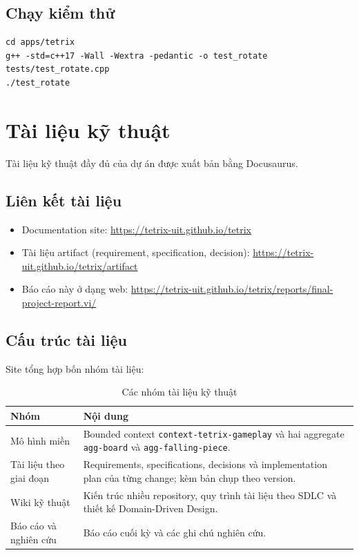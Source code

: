 \documentclass[12pt,a4paper]{article}
\begin{document}
\subsection{Chạy kiểm thử}

\begin{verbatim}
cd apps/tetrix
g++ -std=c++17 -Wall -Wextra -pedantic -o test_rotate tests/test_rotate.cpp
./test_rotate
\end{verbatim}

\section{Tài liệu kỹ thuật}

Tài liệu kỹ thuật đầy đủ của dự án được xuất bản bằng Docusaurus.

\subsection{Liên kết tài liệu}

\begin{itemize}
  \item Documentation site: \url{https://tetrix-uit.github.io/tetrix}
  \item Tài liệu artifact (requirement, specification, decision): \url{https://tetrix-uit.github.io/tetrix/artifact}
  \item Báo cáo này ở dạng web: \url{https://tetrix-uit.github.io/tetrix/reports/final-project-report.vi/}
\end{itemize}

\subsection{Cấu trúc tài liệu}

Site tổng hợp bốn nhóm tài liệu:

\begin{table}[H]
  \centering
  \small
  \caption{Các nhóm tài liệu kỹ thuật}
  \begin{tabularx}{\textwidth}{P{3.6cm} Y}
    \toprule
    \textbf{Nhóm} & \textbf{Nội dung} \\
    \midrule
    Mô hình miền & Bounded context \texttt{context-tetrix-gameplay} và hai aggregate \texttt{agg-board} và \texttt{agg-falling-piece}. \\
    Tài liệu theo giai đoạn & Requirements, specifications, decisions và implementation plan của từng change; kèm bản chụp theo version. \\
    Wiki kỹ thuật & Kiến trúc nhiều repository, quy trình tài liệu theo SDLC và thiết kế Domain-Driven Design. \\
    Báo cáo và nghiên cứu & Báo cáo cuối kỳ và các ghi chú nghiên cứu. \\
    \bottomrule
  \end{tabularx}
\end{table}
\end{document}
